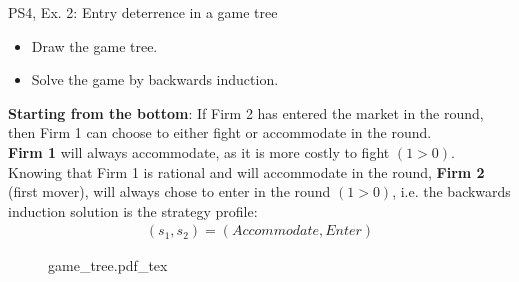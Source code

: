 \begin{frame}{PS4, Ex. 2: Entry deterrence in a game tree}
  \begin{multicols}{2}
    \begin{itemize}
      \item[(a)] Draw the game tree.
      \item[(b)] Solve the game by backwards induction.
    \end{itemize}
    \textbf{Starting from the bottom}: If Firm 2 has entered the market in the  round, then Firm 1 can choose to either fight or accommodate in the  round.\\\medskip
    \textbf{Firm 1} will always accommodate, as it is more costly to fight $(1>0)$.\\\medskip
    Knowing that Firm 1 is rational and will accommodate in the  round, \textbf{Firm 2} (first mover), will always chose to enter in the  round $(1>0)$, i.e. the backwards induction solution is the strategy profile:
      \begin{align*}
        (s_1,s_2)=(Accommodate,Enter)
      \end{align*}
  \vfill\null \columnbreak
    \begin{figure}[!h]
      \begin{center}
      \def\svgwidth{1.0\columnwidth}
      {game_tree.pdf_tex}
      \end{center}
    \end{figure}
  \vfill\null
  \end{multicols}
\end{frame}
